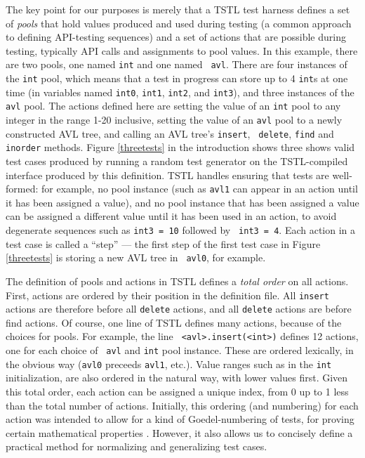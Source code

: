 The key point for our purposes is merely that a TSTL test harness
defines a set of \emph{pools} that hold values produced and used
during testing \cite{AndrewsTR} (a common approach to defining
API-testing sequences) and a set of actions that are possible during
testing, typically API calls and assignments to pool values.  In this
example, there are two pools, one named {\tt int} and one named {\tt
  avl}.  There are four instances of the {\tt int} pool, which means
that a test in progress can store up to 4 {\tt int}s at one time (in
variables named {\tt int0}, {\tt int1}, {\tt int2}, and {\tt int3}), and three
instances of the {\tt avl} pool.  The actions defined here are setting
the value of an {\tt int} pool to any integer in the range 1-20
inclusive, setting the value of an {\tt avl} pool to a newly
constructed AVL tree, and calling an AVL tree's {\tt insert}, {\tt
  delete}, {\tt find} and {\tt inorder} methods.  Figure
\ref{threetests} in the introduction shows three
shows valid test cases produced by running a random test generator on
the TSTL-compiled interface produced by this definition.  TSTL handles
ensuring that tests are well-formed: for example, no pool instance
(such as {\tt avl1} can appear in an action until it has been assigned
a value), and no pool instance that has been assigned a value can be
assigned a different value until it has been used in an action, to
avoid degenerate sequences such as {\tt int3 = 10} followed by {\tt
  int3 = 4}.  Each action in a test case is called a ``step'' --- the
first step of the first test case in Figure \ref{threetests} is storing a new AVL tree in {\tt
  avl0}, for example.

The definition of pools and actions in TSTL defines a \emph{total
  order} on all actions.  First, actions are ordered by their position
in the definition file.  All {\tt insert} actions are therefore before
all {\tt delete} actions, and all {\tt delete} actions are before find
actions.  Of course, one line of TSTL defines many actions, because of
the choices for pools.  For example, the line {\tt
  <avl>.insert(<int>)} defines 12 actions, one for each choice of {\tt
  avl} and {\tt int} pool instance.  These are ordered lexically, in
the obvious way ({\tt avl0} preceeds {\tt avl1}, etc.).  Value ranges
such as in the {\tt int} initialization, are also ordered in the
natural way, with lower values first.  Given this total order, each
action can be assigned a unique index, from 0 up to 1 less than the
total number of actions. Initially, this ordering (and
numbering) for each action was intended to allow for a kind of
Goedel-numbering of tests, for proving certain mathematical properties
\cite{AndrewsTR}.  However, it also allows us to concisely define a
practical method for normalizing and generalizing test cases.

